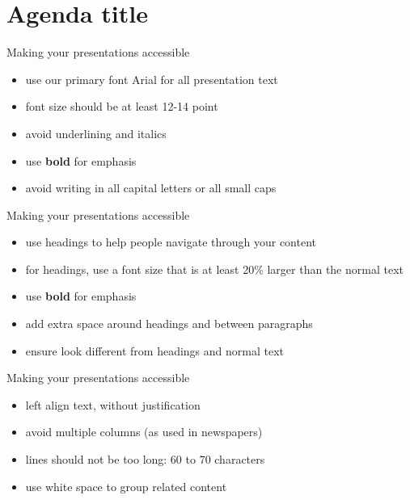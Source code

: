 \documentclass[aspectratio=169, 12pt]{beamer} %
\begin{document}
\section{Agenda title}
\begin{frame}[t]{Making your presentations accessible}
  \begin{itemize}
    \item use our primary font Arial for all presentation text
    \item font size should be at least 12-14 point
    \item avoid underlining and italics
    \item use \textbf{bold} for emphasis
    \item avoid writing in all capital letters or all small caps
  \end{itemize}
\end{frame}

\begin{frame}[t]{Making your presentations accessible}
    \begin{itemize}
      \item use headings to help people navigate through your content
      \item for headings, use a font size that is at least 20\% larger than the normal text
      \item use \textbf{bold} for emphasis
      \item add extra space around headings and between paragraphs
      \item ensure \alert{\underline{}} look different from headings and normal text
    \end{itemize}
  \end{frame}

  \begin{frame}[t]{Making your presentations accessible}
    \begin{itemize}
      \item left align text, without justification
      \item avoid multiple columns (as used in newspapers)
      \item lines should not be too long: 60 to 70 characters
      \item use white space to group related content
    \end{itemize}
  \end{frame}
\end{document}
